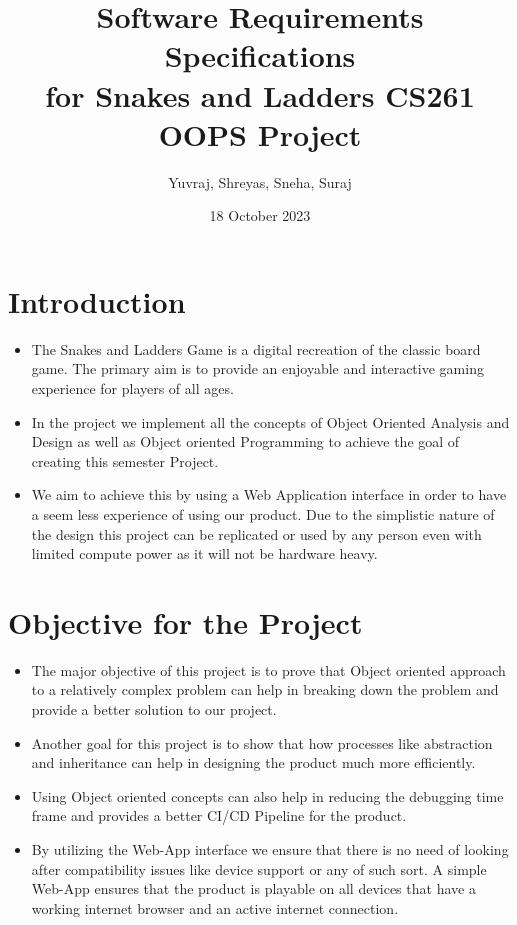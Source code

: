 \documentclass{article}
\title{\Huge Software Requirements Specifications \\for Snakes and Ladders CS261 OOPS Project}
\date{18 October 2023}
\author{Yuvraj, Shreyas, Sneha, Suraj}
\begin{document}
\maketitle

\section{Introduction}
    \begin{itemize}
        \item The Snakes and Ladders Game is a digital recreation of the classic board game. The primary aim is to provide an enjoyable and interactive gaming experience for players of all ages.
        \item In the project we implement all the concepts of Object Oriented Analysis and Design as well as Object oriented Programming to achieve the goal of creating this semester Project.
        \item We aim to achieve this by using a Web Application interface in order to have a seem less experience of using our product. Due to the simplistic nature of the design this project can be replicated or used by any person even with limited compute power as it will not be hardware heavy.
    \end{itemize}

\section{Objective for the Project}
    \begin{itemize}
        \item The major objective of this project is to prove that Object oriented approach to a relatively complex problem can help in breaking down the problem and provide a better solution to our project.
        \item Another goal for this project is to show that how processes like abstraction and inheritance can help in designing the product much more efficiently.
        \item Using Object oriented concepts can also help in reducing the debugging time frame and provides a better CI/CD Pipeline for the product.
        \item By utilizing the Web-App interface we ensure that there is no need of looking after compatibility issues like device support or any of such sort. A simple Web-App ensures that the product is playable on all devices that have a working internet browser and an active internet connection.
    \end{itemize}
\end{document}
